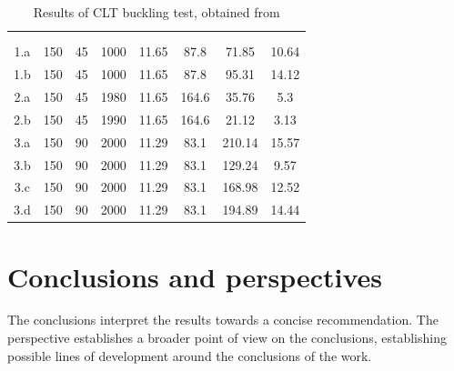         \begin{table}[htbp]
            \centering
            \caption{Results of CLT buckling test, obtained from \textcite{pinaNumericalStudyElastic2019} }
            \begin{tabular}{c
                            S[table-format=3.0]
                            S[table-format=2.0]
                            S[table-format=4.0]
                            S[table-format=2.2]
                            S[table-format=3.1]
                            S[table-format=3.2]
                            S[table-format=2.2]}
            \toprule
                {}
                    & {} 
                        & {}
                            & {}
                                & {}
                                    & {}
                                        & {}
                                            & {} \\
                &&&&&&&\\\midrule
            1.a   & 150   & 45    & 1000  & 11.65 & 87.8  & 71.85 & 10.64 \\
            1.b   & 150   & 45    & 1000  & 11.65 & 87.8  & 95.31 & 14.12 \\
            2.a   & 150   & 45    & 1980  & 11.65 & 164.6 & 35.76 & 5.3 \\
            2.b   & 150   & 45    & 1990  & 11.65 & 164.6 & 21.12 & 3.13 \\
            3.a   & 150   & 90    & 2000  & 11.29 & 83.1  & 210.14 & 15.57 \\
            3.b   & 150   & 90    & 2000  & 11.29 & 83.1  & 129.24 & 9.57 \\
            3.c   & 150   & 90    & 2000  & 11.29 & 83.1  & 168.98 & 12.52 \\
            3.d   & 150   & 90    & 2000  & 11.29 & 83.1  & 194.89 & 14.44 \\\bottomrule
            \end{tabular}%
            \label{tab:CLTresults}%
        \end{table}%

\section{Conclusions and perspectives}
    The conclusions interpret the results towards a concise recommendation. The perspective establishes a broader point of view on the conclusions, establishing possible lines of development around the conclusions of the work.